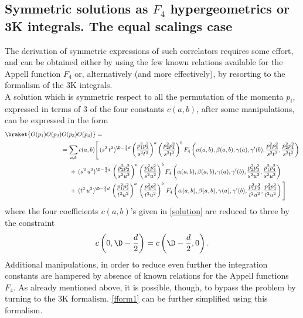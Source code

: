 \documentclass[a4paper,11pt,openright,twoside]{book}
\let\a=\alpha   \let\b=\beta   \let\g=\gamma   \let\d=\delta
\numberwithin{equation}{section}
\begin{document}
{\subsection{Symmetric solutions as \texorpdfstring{$F_4$}{F4} hypergeometrics or 3K integrals. The equal scalings case}
The derivation of symmetric expressions of such correlators requires some effort, and can be obtained either by 
using the few known relations available for the Appell function $F_4$ or, alternatively (and more effectively), by resorting to the formalism of the 3K integrals. \\ 
A solution which is symmetric respect to all the permutation of the momenta $p_i$, expressed in terms of 3 of the four constants $c(a,b)$, after some manipulations, can be expressed in the form
\begin{align}
	\braket{O(p_1)O(p_2)O(p_3)O(p_4)}&=\notag\\
	&\hspace{-2cm}=\sum_{a,b}c(a,b)\Bigg[\,(s^2\,t^2)^{\D-\frac{3}{4}d}\left(\frac{p_1^2p_3^2}{s^2t^2}\right)^a\left(\frac{p_2^2p_4^2}{s^2t^2}\right)^bF_4\left(\a(a,b),\b(a,b),\gamma(a),\g'(b),\frac{p_1^2p_3^2}{s^2t^2},\frac{p_2^2p_4^2}{s^2t^2}\right)\notag\\
	&\hspace{-1.5cm}+\,(s^2\,u^2)^{\D-\frac{3}{4}d}\,\left(\frac{p_2^2p_3^2}{s^2u^2}\right)^{a}\left(\frac{p_1^2p_4^2}{s^2u^2}\right)^{b}F_4\left(\a(a,b),\b(a,b),\gamma(a),\g'(b),\frac{p_2^2p_3^2}{s^2u^2},\frac{p_1^2p_4^2}{s^2u^2}\right)\notag\\
	&\hspace{-1.5cm}+\,(t^2\,u^2)^{\D-\frac{3}{4}d}\,\left(\frac{p_1^2p_2^2}{t^2u^2}\right)^{a}\,\left(\frac{p_3^2p_4^2}{t^2u^2}\right)^{b}\,F_4\left(\a(a,b),\b(a,b),\gamma(a),\g'(b),\frac{p_1^2p_2^2}{t^2u^2},\frac{p_3^2p_4^2}{t^2u^2}\right)
	\Bigg]
	\label{fform1}
\end{align}
where the four coefficients $c(a,b)$'s given in \eqref{solution} are reduced to three by the constraint 
\begin{align}
	c\left(0,\D-\frac{d}{2}\right)=c\left(\D-\frac{d}{2},0\right).
\end{align}
Additional manipulations, in order to reduce even further the integration constants are hampered by absence of known 
relations for the Appell functions $F_4$. As already mentioned above, it is possible, though, to bypass the problem by turning to the 3K formalism. \eqref{fform1} can be further simplified using this formalism. 

}
\end{document}
